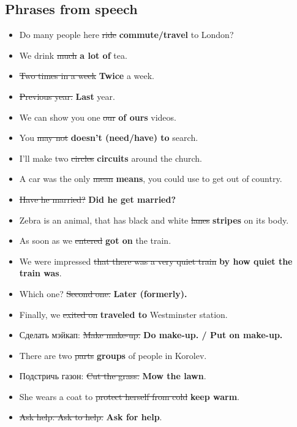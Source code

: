 \documentclass[10pt,a4paper]{article}
\newlength{\OriginalParIndent}
\newenvironment{ItemizeWithOrigParIndent}
    {\begin{itemize}[leftmargin=\OriginalParIndent]}
    {\end{itemize}}
\begin{document}
\newpage
\setcounter{secnumdepth}{3} %


\subsection{Phrases from speech}

\begin{ItemizeWithOrigParIndent}
  \item Do many people here \sout{ride} \textbf{commute/travel} to London?
  \item We drink \sout{much} \textbf{a lot of} tea.
  \item \sout{Two times in a week} \textbf{Twice} a week.
  \item \sout{Previous year.} \textbf{Last} year.
  \item We can show you one \sout{our} \textbf{of ours} videos.
  \item You \sout{may not} \textbf{doesn't (need/have) to} search.
  \item I'll make two \sout{circles} \textbf{circuits} around the church.
  \item A car was the only \sout{mean} \textbf{means}, you could use to get out of country.
  \item \sout{Have he married?} \textbf{Did he get married?}
  \item Zebra is an animal, that has black and white \sout{lanes} \textbf{stripes} on its body.
  \item As soon as we \sout{entered} \textbf{got on} the train.
  \item We were impressed \sout{that there was a very quiet train} \textbf{by
        how quiet the train was}.
  \item Which one? \sout{Second one.} \textbf{Later (formerly).}
  \item Finally, we \sout{exited on} \textbf{traveled to} Westminster station.
  \item Сделать мэйкап: \sout{Make make-up.} \textbf{Do make-up. / Put on make-up.}
  \item There are two \sout{parts} \textbf{groups} of people in Korolev.
  \item Подстричь газон: \sout{Cut the grass.} \textbf{Mow the lawn}.
  \item She wears a coat to \sout{protect herself from cold} \textbf{keep warm}.
  \item \sout{Ask help. Ask to help.} \textbf{Ask for help}.


\end{ItemizeWithOrigParIndent}
\end{document}
